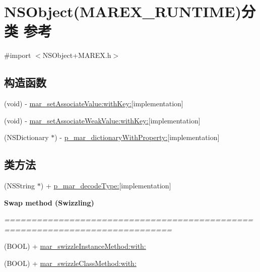 \hypertarget{category_n_s_object_07_m_a_r_e_x___r_u_n_t_i_m_e_08}{}\section{N\+S\+Object(M\+A\+R\+E\+X\+\_\+\+R\+U\+N\+T\+I\+ME)分类 参考}
\label{category_n_s_object_07_m_a_r_e_x___r_u_n_t_i_m_e_08}


{\ttfamily \#import $<$N\+S\+Object+\+M\+A\+R\+E\+X.\+h$>$}

\subsection*{构造函数}
\begin{DoxyCompactItemize}
\item 
(void) -\/ \hyperlink{category_n_s_object_07_m_a_r_e_x___r_u_n_t_i_m_e_08_a00fb202e4f111fc3744154737d0e716e}{mar\+\_\+set\+Associate\+Value\+:with\+Key\+:}{\ttfamily  \mbox{[}implementation\mbox{]}}
\item 
(void) -\/ \hyperlink{category_n_s_object_07_m_a_r_e_x___r_u_n_t_i_m_e_08_aa2490950c6099def1d2005d2f04d2ef5}{mar\+\_\+set\+Associate\+Weak\+Value\+:with\+Key\+:}{\ttfamily  \mbox{[}implementation\mbox{]}}
\item 
(N\+S\+Dictionary $\ast$) -\/ \hyperlink{category_n_s_object_07_m_a_r_e_x___r_u_n_t_i_m_e_08_a884ea3cedee764151014588e09517e04}{p\+\_\+mar\+\_\+dictionary\+With\+Property\+:}{\ttfamily  \mbox{[}implementation\mbox{]}}
\end{DoxyCompactItemize}
\subsection*{类方法}
\begin{DoxyCompactItemize}
\item 
(N\+S\+String $\ast$) + \hyperlink{category_n_s_object_07_m_a_r_e_x___r_u_n_t_i_m_e_08_ab70e7eca2f70666c311c863f6e0359b8}{p\+\_\+mar\+\_\+decode\+Type\+:}{\ttfamily  \mbox{[}implementation\mbox{]}}
\end{DoxyCompactItemize}
\begin{Indent}\textbf{ Swap method (Swizzling)}\par
{\em ============================================================================= 

 }\begin{DoxyCompactItemize}
\item 
(B\+O\+OL) + \hyperlink{category_n_s_object_07_m_a_r_e_x___r_u_n_t_i_m_e_08_a6471910e9a4a9044dc6f18de15e7d090}{mar\+\_\+swizzle\+Instance\+Method\+:with\+:}
\item 
(B\+O\+OL) + \hyperlink{category_n_s_object_07_m_a_r_e_x___r_u_n_t_i_m_e_08_ace128222e6b9f5b9d2c12f4d634100a2}{mar\+\_\+swizzle\+Class\+Method\+:with\+:}
\end{DoxyCompactItemize}
\end{Indent}
